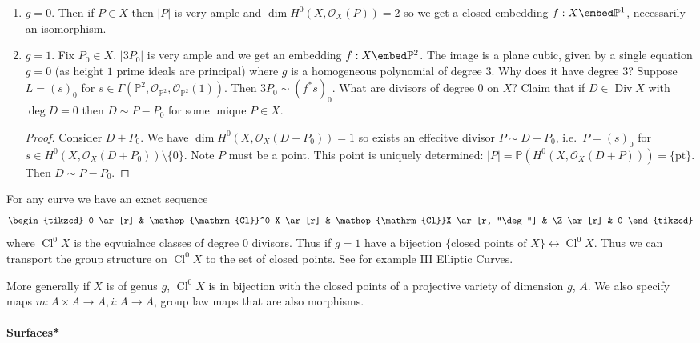 \documentclass[a4paper]{article}
\renewcommand*{\P}{\mathbb{P}}
\newcommand{\sh}[1]{\mathcal{#1}} %
\DeclareMathOperator{\Div}{Div} %
\DeclareMathOperator{\Cl}{Cl} %
\begin{document}
\begin{eg}\leavevmode
  \begin{enumerate}
  \item \(g = 0\). Then if \(P \in X\) then \(|P|\) is very ample and \(\dim H^0(X, \sh O_X(P)) = 2\) so we get a closed embedding \(f: X \embed \P^1\), necessarily an isomorphism.
  \item \(g = 1\). Fix \(P_0 \in X\). \(|3P_0|\) is very ample and we get an embedding \(f: X \embed \P^2\). The image is a plane cubic, given by a single equation \(g = 0\) (as height \(1\) prime ideals are principal) where \(g\) is a homogeneous polynomial of degree \(3\). Why does it have degree \(3\)? Suppose \(L = (s)_0\) for \(s \in \Gamma(\P^2, \sh O_{\P^2}, \sh O_{\P^2}(1))\). Then \(3P_0 \sim (f^* s)_0\). What are divisors of degree \(0\) on \(X\)? Claim that if \(D \in \Div X\) with \(\deg D = 0\) then \(D \sim P - P_0\) for some unique \(P \in X\).

    \begin{proof}
      Consider \(D + P_0\). We have \(\dim H^0(X, \sh O_X(D + P_0)) = 1\) so exists an effecitve divisor \(P \sim D + P_0\), i.e.\ \(P = (s)_0\) for \(s \in H^0(X, \sh O_X(D + P_0)) \setminus \{0\}\). Note \(P\) must be a point. This point is uniquely determined: \(|P| = \P(H^0(X, \sh O_X(D + P))) = \{\mathrm{pt}\}\). Then \(D \sim P - P_0\).
    \end{proof}
  \end{enumerate}
\end{eg}

For any curve we have an exact sequence
\[
  \begin{tikzcd}
    0 \ar[r] & \Cl^0 X \ar[r] & \Cl X \ar[r, "\deg"] & \Z \ar[r] & 0
  \end{tikzcd}
\]
where \(\Cl^0 X\) is the eqvuialnce classes of degree \(0\) divisors. Thus if \(g = 1\) have a bijection \(\{\text{closed points of } X\} \leftrightarrow \Cl^0 X\). Thus we can transport the group structure on \(\Cl^0 X\) to the set of closed points. See for example III Elliptic Curves.

More generally if \(X\) is of genus \(g\), \(\Cl^0 X\) is in bijection with the closed points of a projective variety of dimension \(g\), \(A\). We also specify maps \(m: A \times A \to A, i: A \to A\), group law maps that are also morphisms.

\paragraph{Surfaces*}
\end{document}
